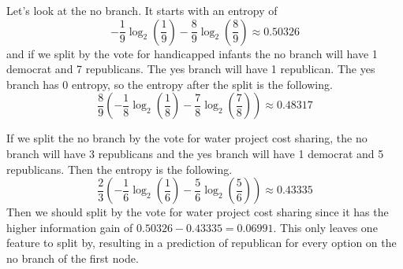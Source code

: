 \documentclass[12pt]{article}
\begin{document}
Let's look at the no branch. It starts with an entropy of
\[-\frac{1}{9}\log_2\left(\frac{1}{9}\right)-\frac{8}{9}\log_2\left(\frac{8}{9}\right)\approx0.50326\]
and if we split by the vote for handicapped infants the no branch will have 1 democrat and 7 republicans. The yes
branch will have 1 republican. The yes branch has 0 entropy, so the entropy after the split is the following.
\[\frac{8}{9}\left(-\frac{1}{8}\log_2\left(\frac{1}{8}\right)-\frac{7}{8}\log_2\left(\frac{7}{8}\right)\right)\approx 0.48317\]

If we split the no branch by the vote for water project cost sharing, the no branch will have 3 republicans and the yes branch
will have 1 democrat and 5 republicans. Then the entropy is the following.
\[\frac{2}{3}\left(-\frac{1}{6}\log_2\left(\frac{1}{6}\right)-\frac{5}{6}\log_2\left(\frac{5}{6}\right)\right)\approx 0.43335\]
Then we should split by the vote for water project cost sharing since it has the higher information gain of \(0.50326-0.43335=0.06991\).
This only leaves one feature to split by, resulting in a prediction of republican for every option on the no branch of the first node.
\end{document}
